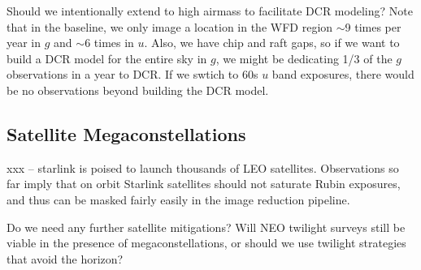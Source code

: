 Should we intentionally extend to high airmass to facilitate DCR modeling? Note that in the baseline, we only image a location in the WFD region $\sim$9 times per year in $g$ and $\sim$6 times in $u$. Also, we have chip and raft gaps, so if we want to build a DCR model for the entire sky in $g$, we might be dedicating 1/3 of the $g$ observations in a year to DCR. If we swtich to 60s $u$ band exposures, there would be no observations beyond building the DCR model. 

\subsection{Satellite Megaconstellations}

xxx -- starlink is poised to launch thousands of LEO satellites. Observations so far imply that on orbit Starlink satellites should not saturate Rubin exposures, and thus can be masked fairly easily in the image reduction pipeline. 

Do we need any further satellite mitigations? Will NEO twilight surveys still be viable in the presence of megaconstellations, or should we use twilight strategies that avoid the horizon?


